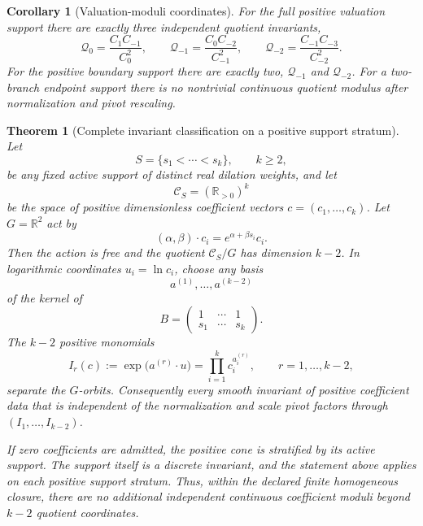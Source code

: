 \documentclass[aps,prd,preprint,onecolumn,nofootinbib,superscriptaddress,showkeys]{revtex4-2}
\numberwithin{equation}{section}
\theoremstyle{definition}
\theoremstyle{plain}
\newtheorem{theorem}{Theorem}[section]
\newtheorem{corollary}{Corollary}[section]
\begin{document}
\begin{corollary}[Valuation-moduli coordinates]\label{cor:valuation-moduli}
For the full positive valuation support there are exactly three independent quotient invariants,
\begin{equation}
\boxed{
\mathcal Q_0=\frac{C_1C_{-1}}{C_0^2},
\qquad
\mathcal Q_{-1}=\frac{C_0C_{-2}}{C_{-1}^2},
\qquad
\mathcal Q_{-2}=\frac{C_{-1}C_{-3}}{C_{-2}^2}.
}
\end{equation}
For the positive boundary support there are exactly two, $\mathcal Q_{-1}$ and $\mathcal Q_{-2}$.  For a two-branch endpoint support there is no nontrivial continuous quotient modulus after normalization and pivot rescaling.
\end{corollary}

\begin{theorem}[Complete invariant classification on a positive support stratum]\label{thm:invariant-completeness}
Let
\[
S=\{s_1<\cdots<s_k\},\qquad k\ge2,
\]
be any fixed active support of distinct real dilation weights, and let
\[
\mathcal C_S=(\mathbb R_{>0})^k
\]
be the space of positive dimensionless coefficient vectors $c=(c_1,\ldots,c_k)$.  Let $G=\mathbb R^2$ act by
\begin{equation}
(\alpha,\beta)\cdot c_i=e^{\alpha+\beta s_i}c_i.
\end{equation}
Then the action is free and the quotient $\mathcal C_S/G$ has dimension $k-2$.  In logarithmic coordinates $u_i=\ln c_i$, choose any basis
\[
a^{(1)},\ldots,a^{(k-2)}
\]
of the kernel of
\begin{equation}
B=
\begin{pmatrix}
1&\cdots&1\\
s_1&\cdots&s_k
\end{pmatrix}.
\end{equation}
The $k-2$ positive monomials
\begin{equation}
\boxed{
I_r(c):=\exp\!\bigl(a^{(r)}\!\cdot u\bigr)
       =\prod_{i=1}^{k}c_i^{a_i^{(r)}},
\qquad r=1,\ldots,k-2,
}
\end{equation}
separate the $G$-orbits.  Consequently every smooth invariant of positive coefficient data that is independent of the normalization and scale pivot factors through $(I_1,\ldots,I_{k-2})$.

If zero coefficients are admitted, the positive cone is stratified by its active support.  The support itself is a discrete invariant, and the statement above applies on each positive support stratum.  Thus, within the declared finite homogeneous closure, there are no additional independent continuous coefficient moduli beyond $k-2$ quotient coordinates.
\end{theorem}
\end{document}
